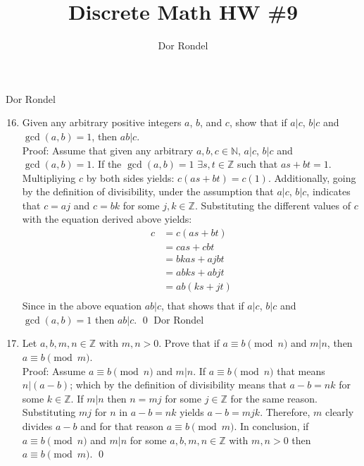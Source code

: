 \documentclass{article}
\title{Discrete Math HW \#9}
\author{Dor Rondel}
\begin{document}
\maketitle
\newpage
Dor Rondel \\
\begin{enumerate}
  \setcounter{enumi}{15}
  \item Given any arbitrary positive integers $a$, $b$, and $c$, show that if $a|c$, $b|c$ and $\gcd(a,b)=1$, then $ab|c$. \\
  \newline
  Proof: Assume that given any arbitrary $a,b,c \in \mathbb{N}$, $a|c$, $b|c$ and $\gcd(a,b)=1$. If the $\gcd(a,b)=1$  $\exists s,t \in \mathbb{Z}$ such that $as+bt=1$. Multipliying $c$ by both sides yields: $c(as+bt) = c(1)$. Additionally, going by the definition of divisibility, under the assumption that $a|c$, $b|c$, indicates that $c=aj$ and $c=bk$ for some $j,k \in \mathbb{Z}$. Substituting the different values of $c$ with the equation derived above yields: 
  \begin{align*}
  c & = c(as+bt) \\
    & = cas + cbt \\
    & = bkas + ajbt \\
    & = abks + abjt \\
    & = ab(ks + jt) \\
  \end{align*}
 Since in the above equation $ab|c$, that shows that if $a|c$, $b|c$ and $\gcd(a,b)=1$ then $ab|c$. \qed
 \newpage
Dor Rondel \\
  \item Let $a, b, m, n \in \mathbb{Z}$ with $m,n >0$. Prove that if $a\equiv b \pmod{n}$ and $m|n$, then $a\equiv b \pmod{m}$. \\
  \newline
  Proof: Assume $a\equiv b \pmod{n}$ and $m|n$. If $a\equiv b \pmod{n}$ that means $n|(a-b)$; which by the definition of divisibility means that $a-b=nk$ for some $k \in \mathbb{Z}$. If $m|n$ then $n=mj$ for some $j \in \mathbb{Z}$ for the same reason. Substituting $mj$ for $n$ in $a-b=nk$ yields $a-b=mjk$. Therefore, $m$ clearly divides $a-b$ and for that reason $a\equiv b \pmod{m}$. In conclusion, if $a\equiv b \pmod{n}$ and $m|n$ for some $a,b,m,n \in \mathbb{Z}$ with $m,n >0$ then $a\equiv b \pmod{m}$. \qed
 \end{enumerate}
\end{document}
